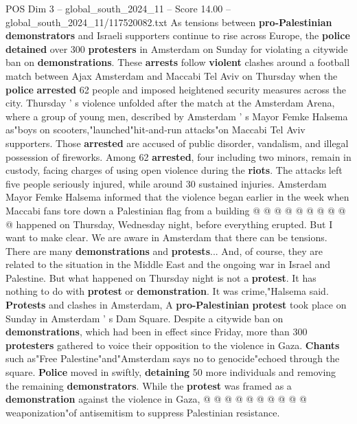 \begin{textsample}{POS Dim 3 – global\_south\_2024\_11 – Score 14.00 – global\_south\_2024\_11/117520082.txt}  \label{ex:f3_pos_319}
As tensions between \textbf{pro-Palestinian} \textbf{demonstrators} and Israeli supporters continue to rise across Europe, the \textbf{police} \textbf{detained} over 300 \textbf{protesters} in Amsterdam on Sunday for violating a citywide ban on \textbf{demonstrations}.
These \textbf{arrests} follow \textbf{violent} clashes around a football match between Ajax Amsterdam and Maccabi Tel Aviv on Thursday when the \textbf{police} \textbf{arrested} 62 people and imposed heightened security measures across the city.
Thursday ' s violence unfolded after the match at the Amsterdam Arena, where a group of young men, described by Amsterdam ' s Mayor Femke Halsema as"boys on scooters,"launched"hit-and-run attacks"on Maccabi Tel Aviv supporters.
Those \textbf{arrested} are accused of public disorder, vandalism, and illegal possession of fireworks.
Among 62 \textbf{arrested}, four including two minors, remain in custody, facing charges of using open violence during the \textbf{riots}.
The attacks left five people seriously injured, while around 30 sustained injuries.
Amsterdam Mayor Femke Halsema informed that the violence began earlier in the week when Maccabi fans tore down a Palestinian flag from a building @ @ @ @ @ @ @ @ @ @ happened on Thursday, Wednesday night, before everything erupted.
But I want to make clear.
We are aware in Amsterdam that there can be tensions.
There are many \textbf{demonstrations} and \textbf{protests}...
And, of course, they are related to the situation in the Middle East and the ongoing war in Israel and Palestine.
But what happened on Thursday night is not a \textbf{protest}.
It has nothing to do with \textbf{protest} or \textbf{demonstration}.
It was crime,"Halsema said. \textbf{Protests} and clashes in Amsterdam, A \textbf{pro-Palestinian} \textbf{protest} took place on Sunday in Amsterdam ' s Dam Square.
Despite a citywide ban on \textbf{demonstrations}, which had been in effect since Friday, more than 300 \textbf{protesters} gathered to voice their opposition to the violence in Gaza. \textbf{Chants} such as"Free Palestine"and"Amsterdam says no to genocide"echoed through the square. \textbf{Police} moved in swiftly, \textbf{detaining} 50 more individuals and removing the remaining \textbf{demonstrators}.
While the \textbf{protest} was framed as a \textbf{demonstration} against the violence in Gaza, @ @ @ @ @ @ @ @ @ @ weaponization"of antisemitism to suppress Palestinian resistance.

\end{textsample}
